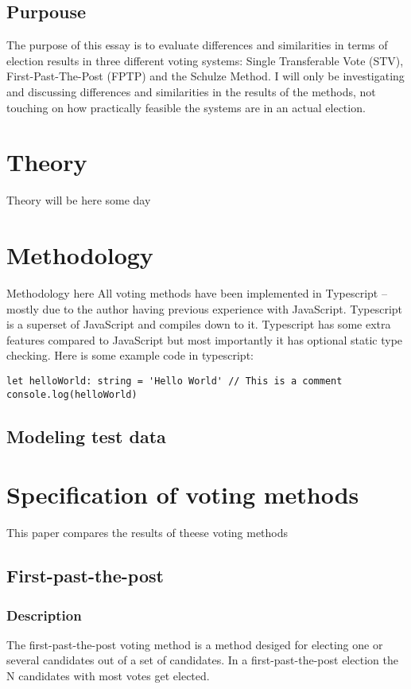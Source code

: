 \subsection{Purpouse}
The purpose of this essay is to evaluate differences and similarities in terms of election results in three different voting systems: Single Transferable Vote (STV), First-Past-The-Post (FPTP) and the Schulze Method. I will only be investigating and discussing differences and similarities in the results of the methods, not touching on how practically feasible the systems are in an actual election.
\pagebreak
\section{Theory}
Theory will be here some day
\section{Methodology}
Methodology here
All voting methods have been implemented in Typescript – mostly due to the author having previous experience with JavaScript. Typescript is a superset of JavaScript and compiles down to it. Typescript has some extra features compared to JavaScript but most importantly it has optional static type checking. Here is some example code in typescript:
\begin{lstlisting}
let helloWorld: string = 'Hello World' // This is a comment
console.log(helloWorld)
\end{lstlisting}
\subsection{Modeling test data}


\pagebreak
\section{Specification of voting methods}
This paper compares the results of theese voting methods
\subsection{First-past-the-post}
\subsubsection{Description}
The first-past-the-post voting method is a method desiged for electing one or several candidates out of a set of candidates. In a first-past-the-post election the N candidates with most votes get elected.
